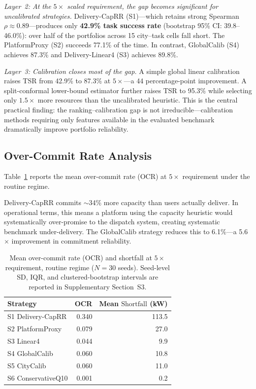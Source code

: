 \documentclass[utf8]{FrontiersinHarvard}
\newcommand{\Shortfall}{\mathrm{Shortfall}}
\begin{document}
\textit{Layer~2: At the $5\times$ scaled requirement, the gap becomes
significant for uncalibrated strategies.} Delivery-CapRR
(S1)---which retains strong Spearman~$\rho \approx 0.89$---produces
only \textbf{42.9\% task success rate} (bootstrap 95\% CI: 39.8--46.0\%):
over half of the portfolios across 15 city--task cells fall
short. The PlatformProxy (S2) succeeds 77.1\% of the time.
In contrast, GlobalCalib (S4) achieves 87.3\% and Delivery-Linear4
(S3) achieves 89.8\%.

\textit{Layer~3: Calibration closes most of the gap.} A simple
global linear calibration raises TSR from 42.9\% to 87.3\% at
$5\times$---a 44 percentage-point improvement. A split-conformal
lower-bound estimator further raises TSR to 95.3\% while selecting
only $1.5\times$ more resources than the uncalibrated heuristic.
This is the central practical finding: the
ranking--calibration gap is not irreducible---calibration
methods requiring only features available in the evaluated benchmark
dramatically improve portfolio reliability.

\subsection{Over-Commit Rate Analysis}

Table~\ref{tab:ocr} reports the mean over-commit rate (OCR) at
$5\times$ requirement under the routine regime.

Delivery-CapRR commits $\sim$34\% more capacity than users
actually deliver. In operational terms, this means a platform
using the capacity heuristic would systematically over-promise
to the dispatch system, creating systematic benchmark under-delivery.
The GlobalCalib strategy reduces this to 6.1\%---a 5.6$\times$
improvement in commitment reliability.

\begin{table}[h!]
\centering
\caption{Mean over-commit rate (OCR) and shortfall at $5\times$
requirement, routine regime ($N=30$ seeds). Seed-level SD,
IQR, and clustered-bootstrap intervals are reported in
Supplementary Section~S3.}
\label{tab:ocr}
\begin{tabular}{lrr}
\toprule
\textbf{Strategy} & \textbf{OCR} & \textbf{Mean $\Shortfall$ (kW)} \\
\midrule
S1 Delivery-CapRR & 0.340 & 113.5 \\
S2 PlatformProxy & 0.079 & 27.0 \\
S3 Linear4 & 0.044 & 9.9 \\
S4 GlobalCalib & 0.060 & 10.8 \\
S5 CityCalib & 0.060 & 11.0 \\
S6 ConservativeQ10 & 0.001 & 0.2 \\
\bottomrule
\end{tabular}
\end{table}
\end{document}
